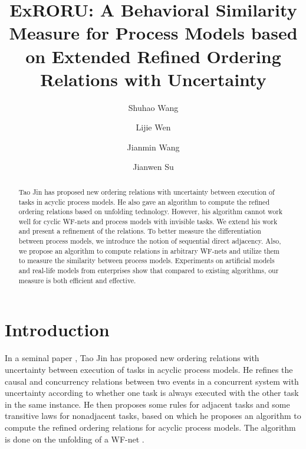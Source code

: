 \documentclass{llncs}
\begin{document}
\frontmatter 
\pagestyle{headings}

\mainmatter
\title{ExRORU: A Behavioral Similarity Measure for Process Models based on Extended Refined Ordering Relations with Uncertainty}

\author[$\$$]{Shuhao Wang}
\author[$\$$]{Lijie Wen}
\author[$\$$]{Jianmin Wang}
\author[$\#$]{Jianwen Su}
\institute{}

\maketitle

\begin{abstract}
Tao Jin has proposed new ordering relations with uncertainty between execution of tasks in acyclic process models. He also gave an algorithm to compute the refined ordering relations based on unfolding technology. However, his algorithm cannot work well for cyclic WF-nets and process models with invisible tasks. We extend his work and present a refinement of the relations. To better measure the differentiation between process models, we introduce the notion of sequential direct adjacency. Also, we propose an algorithm to compute relations in arbitrary WF-nets and utilize them to measure the similarity between process models. Experiments on artificial models and real-life models from enterprises show that compared to existing algorithms, our measure is both efficient and effective.
\end{abstract}

\section{Introduction}\label{sec:introduction}

In a seminal paper \cite{jin2014computing}, Tao Jin has proposed new ordering relations with uncertainty between execution of tasks in acyclic process models. He refines the causal and concurrency relations between two events in a concurrent system with uncertainty according to whether one task is always executed with the other task in the same instance. He then proposes some rules for adjacent tasks and some transitive laws for nonadjacent tasks, based on which he proposes an algorithm to compute the refined ordering relations for acyclic process models. The algorithm is done on the unfolding of a WF-net \cite{mcmillan1995technique,esparza1996improvement}.
\end{document}

